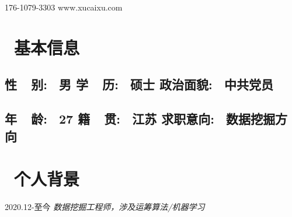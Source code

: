 \documentclass{resume}
\begin{document}











\medskip

    {176-1079-3303}    {www.xucaixu.com} 










\section{   \faHome  \  基本信息}
   \subsection{  \hspace{ 0.4cm }     \textbf{性\ \ 别}:    \ 男   
                        \hspace{ 3.2cm }     \textbf{学\ \ 历}:   \ 硕士 
                        \hspace{ 3.2cm }     \textbf{政治面貌}: \ 中共党员 }

   \subsection{  \hspace{ 0.4cm }     \textbf{年\ \ 龄}:     \ 27   
                        \hspace{ 3.2cm }     \textbf{籍\ \ 贯}:     \ 江苏 
                        \hspace{ 3.2cm }     \textbf{求职意向}:  \ 数据挖掘方向 }
  
\medskip















\section{   \faUser    \  个人背景}

                                     {2020.12-至今}
   \faUserMd   \textit{   数据挖掘工程师，涉及运筹算法/机器学习}
\end{document}
